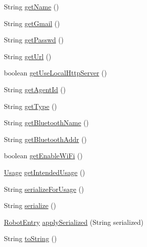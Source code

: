 \begin{DoxyCompactItemize}
\item 
String \hyperlink{classcom_1_1cellbots_1_1_robot_entry_a6499b615e4c553642c45d7900f65ea9c}{get\-Name} ()
\item 
String \hyperlink{classcom_1_1cellbots_1_1_robot_entry_ac01f73034e8ae48bfb115ac9e205e8aa}{get\-Gmail} ()
\item 
String \hyperlink{classcom_1_1cellbots_1_1_robot_entry_a9a6db74ca1d30f55e7c8d5f0f46a8669}{get\-Passwd} ()
\item 
String \hyperlink{classcom_1_1cellbots_1_1_robot_entry_aca7fa6d687ac76c49bbc6b65bd48722d}{get\-Url} ()
\item 
boolean \hyperlink{classcom_1_1cellbots_1_1_robot_entry_af89d8ac7617ef3ec85e29c12097b6d4e}{get\-Use\-Local\-Http\-Server} ()
\item 
String \hyperlink{classcom_1_1cellbots_1_1_robot_entry_a96aadfc5a4fef1adb3a218756fa5b439}{get\-Agent\-Id} ()
\item 
String \hyperlink{classcom_1_1cellbots_1_1_robot_entry_a52e3413f939d5b32118091449803fbfe}{get\-Type} ()
\item 
String \hyperlink{classcom_1_1cellbots_1_1_robot_entry_adc9f752c236830128769ee90ee947ed0}{get\-Bluetooth\-Name} ()
\item 
String \hyperlink{classcom_1_1cellbots_1_1_robot_entry_ad5a2bd8289e1ef28ae6f580a71b9154d}{get\-Bluetooth\-Addr} ()
\item 
boolean \hyperlink{classcom_1_1cellbots_1_1_robot_entry_a4b353f4065c767cad908af7e41c107a2}{get\-Enable\-Wi\-Fi} ()
\item 
\hyperlink{enumcom_1_1cellbots_1_1_robot_entry_1_1_usage}{Usage} \hyperlink{classcom_1_1cellbots_1_1_robot_entry_a5514ee9d775ce0ae46040f8268552954}{get\-Intended\-Usage} ()
\item 
String \hyperlink{classcom_1_1cellbots_1_1_robot_entry_ac07dd198df91e9e627cae6be80d50572}{serialize\-For\-Usage} ()
\item 
String \hyperlink{classcom_1_1cellbots_1_1_robot_entry_ad4e386b5ce8f586a765974427acfd85d}{serialize} ()
\item 
\hyperlink{classcom_1_1cellbots_1_1_robot_entry}{Robot\-Entry} \hyperlink{classcom_1_1cellbots_1_1_robot_entry_a5407ae93a3b7b3eaf66625165130626b}{apply\-Serialized} (String serialized)
\item 
String \hyperlink{classcom_1_1cellbots_1_1_robot_entry_a10ea819a6cfd7b554c8790747d5d493a}{to\-String} ()
\end{DoxyCompactItemize}
